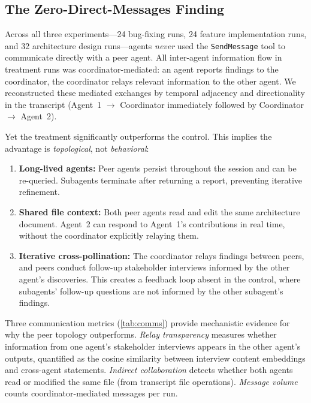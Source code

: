 \documentclass[11pt,letterpaper]{article}
\begin{document}
\subsection{The Zero-Direct-Messages Finding}

Across all three experiments---24 bug-fixing runs, 24 feature
implementation runs, and 32 architecture design runs---agents
\emph{never} used the \texttt{SendMessage} tool to communicate directly
with a peer agent. All inter-agent information flow in treatment runs
was coordinator-mediated: an agent reports findings to the coordinator,
the coordinator relays relevant information to the other agent. We
reconstructed these mediated exchanges by temporal adjacency and
directionality in the transcript (Agent~1 $\to$ Coordinator immediately
followed by Coordinator $\to$ Agent~2).

Yet the treatment significantly outperforms the control. This implies
the advantage is \emph{topological}, not \emph{behavioral}:

\begin{enumerate}
  \item \textbf{Long-lived agents:} Peer agents persist throughout the
    session and can be re-queried. Subagents terminate after returning
    a report, preventing iterative refinement.
  \item \textbf{Shared file context:} Both peer agents read and edit
    the same architecture document. Agent~2 can respond to Agent~1's
    contributions in real time, without the coordinator explicitly
    relaying them.
  \item \textbf{Iterative cross-pollination:} The coordinator relays
    findings between peers, and peers conduct follow-up stakeholder
    interviews informed by the other agent's discoveries. This creates
    a feedback loop absent in the control, where subagents' follow-up
    questions are not informed by the other subagent's findings.
\end{enumerate}

Three communication metrics (\cref{tab:comms}) provide mechanistic
evidence for why the peer topology outperforms. \emph{Relay transparency} measures
whether information from one agent's stakeholder interviews appears
in the other agent's outputs, quantified as the cosine similarity
between interview content embeddings and cross-agent statements.
\emph{Indirect collaboration} detects whether both agents read or
modified the same file (from transcript file operations).
\emph{Message volume} counts coordinator-mediated messages per run.
\end{document}
